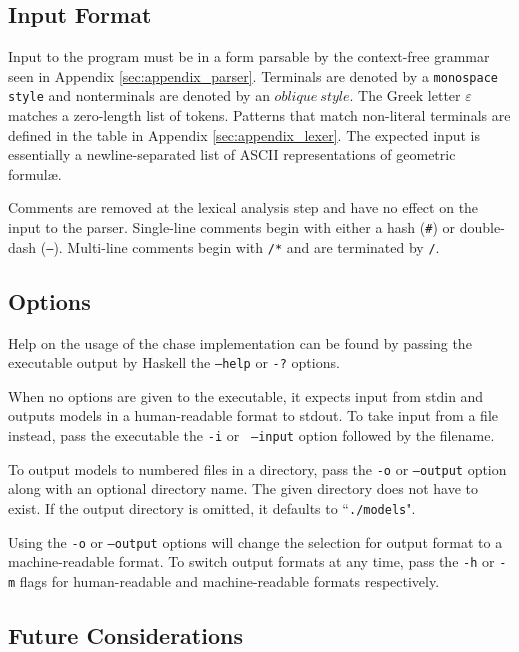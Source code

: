 	\subsection{Input Format}

		Input to the program must be in a form parsable by the context-free
		grammar seen in Appendix \ref{sec:appendix_parser}. Terminals are
		denoted by a {\tt monospace style} and nonterminals are denoted by an
		$oblique\ style$. The Greek letter $\varepsilon$ matches a zero-length
		list of tokens. Patterns that match non-literal terminals are defined
		in the table in Appendix \ref{sec:appendix_lexer}. The expected input
		is essentially a newline-separated list of ASCII representations of
		geometric formul{\ae}.

		Comments are removed at the lexical analysis step and have no effect on
		the input to the parser. Single-line comments begin with either a hash
		({\tt \#}) or double-dash ({\tt --}). Multi-line comments begin with
		{\tt /*} and are terminated by {\tt */}.

	\subsection{Options}

		Help on the usage of the chase implementation can be found by passing
		the executable output by Haskell the {\tt --help} or {\tt -?} options.

		When no options are given to the executable, it expects input from
		stdin and outputs models in a human-readable format to stdout. To take
		input from a file instead, pass the executable the {\tt -i} or {\tt
		--input} option followed by the filename.

		To output models to numbered files in a directory, pass the {\tt -o} or
		{\tt --output} option along with an optional directory name. The given
		directory does not have to exist. If the output directory is omitted,
		it defaults to ``{\tt ./models}".

		Using the {\tt -o} or {\tt --output} options will change the selection
		for output format to a machine-readable format. To switch output formats
		at any time, pass the {\tt -h} or {\tt -m} flags for human-readable and
		machine-readable formats respectively.


	\subsection{Future Considerations}

